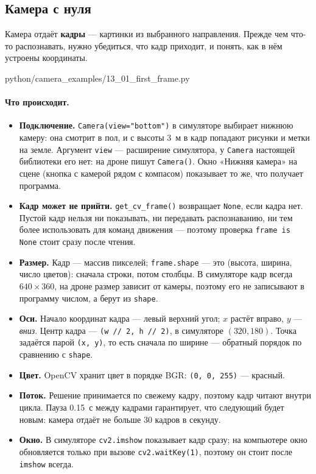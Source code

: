 \subsection{Камера с нуля}
\label{sec:python-camera-basics}

Камера отдаёт \textbf{кадры} --- картинки из выбранного направления. Прежде чем что-то распознавать, нужно убедиться, что кадр приходит, и понять, как в нём устроены координаты.

\begin{codefile}[python]{python/camera_examples/13_01_first_frame.py}
\end{codefile}

\paragraph{Что происходит.}
\begin{itemize}
    \item \textbf{Подключение.} \verb|Camera(view="bottom")| в симуляторе выбирает нижнюю камеру: она смотрит в пол, и с высоты 3~м в кадр попадают рисунки и метки на земле. Аргумент \verb|view| --- расширение симулятора, у \verb|Camera| настоящей библиотеки его нет: на дроне пишут \verb|Camera()|. Окно «Нижняя камера» на сцене (кнопка с камерой рядом с компасом) показывает то же, что получает программа.
    \item \textbf{Кадр может не прийти.} \verb|get_cv_frame()| возвращает \verb|None|, если кадра нет. Пустой кадр нельзя ни показывать, ни передавать распознаванию, ни тем более использовать для команд движения --- поэтому проверка \verb|frame is None| стоит сразу после чтения.
    \item \textbf{Размер.} Кадр --- массив пикселей; \verb|frame.shape| --- это (высота, ширина, число цветов): сначала строки, потом столбцы. В симуляторе кадр всегда $640\times360$, на дроне размер зависит от камеры, поэтому его не записывают в программу числом, а берут из \verb|shape|.
    \item \textbf{Оси.} Начало координат кадра --- левый верхний угол; $x$ растёт вправо, $y$ --- \emph{вниз}. Центр кадра --- \verb|(w // 2, h // 2)|, в симуляторе $(320, 180)$. Точка задаётся парой \verb|(x, y)|, то есть сначала по ширине --- обратный порядок по сравнению с \verb|shape|.
    \item \textbf{Цвет.} OpenCV хранит цвет в порядке BGR: \verb|(0, 0, 255)| --- красный.
    \item \textbf{Поток.} Решение принимается по свежему кадру, поэтому кадр читают внутри цикла. Пауза 0.15~с между кадрами гарантирует, что следующий будет новым: камера отдаёт не больше 30 кадров в секунду.
    \item \textbf{Окно.} В симуляторе \verb|cv2.imshow| показывает кадр сразу; на компьютере окно обновляется только при вызове \verb|cv2.waitKey(1)|, поэтому он стоит после \verb|imshow| всегда.
\end{itemize}

